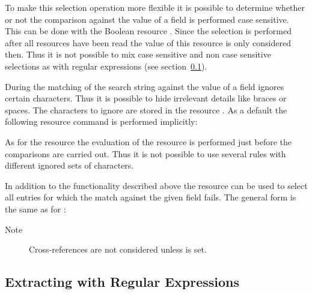 \documentclass[11pt,a4paper]{scrbook}
\begin{document}
\begin{Resources}
\end{Resources}

To make this selection operation more flexible it is possible to determine
whether or not the comparison against the value of a field is performed case
sensitive. This can be done with the Boolean resource
. Since the selection is performed after all
resources have been read the value of this resource is only considered then.
Thus it is not possible to mix case sensitive and non case sensitive
selections as with regular expressions (see section~\ref{sec:extract}).

During the matching of the search string against the value of a field
\BibTool{} ignores certain characters. Thus it is possible to hide irrelevant
details like braces or spaces. The characters to ignore are stored in the
resource . As a default the following resource
command is performed implicitly:

\begin{Resources}
\end{Resources}

As for the resource  the evaluation of the resource
 is performed just before the comparisons are
carried out. Thus it is not possible to use several rules with different
ignored sets of characters.

In addition to the functionality described above the resource
 can be used to select all entries for which the
match against the given field fails. The general form is the same as for
:

\begin{Resources}
\end{Resources}

\begin{description}
\item[Note] Cross-references are not considered unless 
  is set.
\end{description}

\subsection{Extracting with Regular Expressions}\label{sec:extract}
\end{document}
